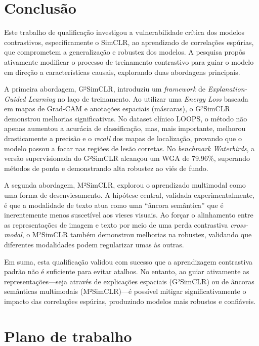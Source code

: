 \section{Conclusão}

Este trabalho de qualificação investigou a vulnerabilidade crítica dos modelos contrastivos, especificamente o SimCLR, ao aprendizado de correlações espúrias, que comprometem a generalização e robustez dos modelos. A pesquisa propôs ativamente modificar o processo de treinamento contrastivo para guiar o modelo em direção a características causais, explorando duas abordagens principais.

A primeira abordagem, G²SimCLR, introduziu um \textit{framework} de \textit{Explanation-Guided Learning} no laço de treinamento. Ao utilizar uma \textit{Energy Loss} baseada em mapas de Grad-CAM e anotações espaciais (máscaras), o G²SimCLR demonstrou melhorias significativas. No dataset clínico LOOPS, o método não apenas aumentou a acurácia de classificação, mas, mais importante, melhorou drasticamente a precisão e o \textit{recall} dos mapas de localização, provando que o modelo passou a focar nas regiões de lesão corretas. No \textit{benchmark Waterbirds}, a versão supervisionada do G²SimCLR alcançou um WGA de 79.96\%, superando métodos de ponta e demonstrando alta robustez ao viés de fundo.

A segunda abordagem, M²SimCLR, explorou o aprendizado multimodal como uma forma de desenviesamento. A hipótese central, validada experimentalmente, é que a modalidade de texto atua como uma ``âncora semântica'' que é inerentemente menos suscetível aos vieses visuais. Ao forçar o alinhamento entre as representações de imagem e texto por meio de uma perda contrastiva \textit{cross-modal}, o M²SimCLR também demonstrou melhorias na robustez, validando que diferentes modalidades podem regularizar umas às outras.

Em suma, esta qualificação validou com sucesso que a aprendizagem contrastiva padrão não é suficiente para evitar atalhos. No entanto, ao guiar ativamente as representações---seja através de explicações espaciais (G²SimCLR) ou de âncoras semânticas multimodais (M²SimCLR)---é possível mitigar significativamente o impacto das correlações espúrias, produzindo modelos mais robustos e confiáveis.

\section{Plano de trabalho}

